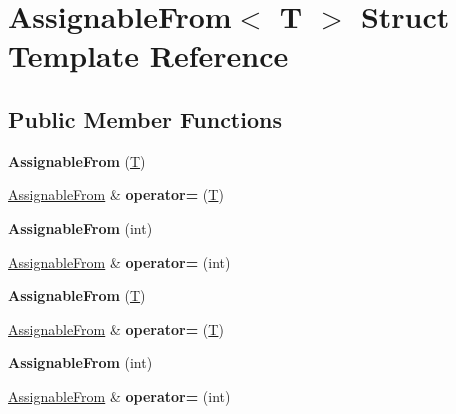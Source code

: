 \hypertarget{struct_assignable_from}{}\section{Assignable\+From$<$ T $>$ Struct Template Reference}
\label{struct_assignable_from}
\subsection*{Public Member Functions}
\begin{DoxyCompactItemize}
\item 
\mbox{\label{struct_assignable_from_a17b5723a93abf2e233bc35a784d2f0b2}} 
{\bfseries Assignable\+From} (\mbox{\hyperlink{struct_t}{T}})
\item 
\mbox{\label{struct_assignable_from_ad114c88030e422720616c0a503061048}} 
\mbox{\hyperlink{struct_assignable_from}{Assignable\+From}} \& {\bfseries operator=} (\mbox{\hyperlink{struct_t}{T}})
\item 
\mbox{\label{struct_assignable_from_ae9e879eee77960ea8fa64e04924dd8f9}} 
{\bfseries Assignable\+From} (int)
\item 
\mbox{\label{struct_assignable_from_a7d93b9b2e798813d5c1e9f2b8261fbcb}} 
\mbox{\hyperlink{struct_assignable_from}{Assignable\+From}} \& {\bfseries operator=} (int)
\item 
\mbox{\label{struct_assignable_from_a17b5723a93abf2e233bc35a784d2f0b2}} 
{\bfseries Assignable\+From} (\mbox{\hyperlink{struct_t}{T}})
\item 
\mbox{\label{struct_assignable_from_ad114c88030e422720616c0a503061048}} 
\mbox{\hyperlink{struct_assignable_from}{Assignable\+From}} \& {\bfseries operator=} (\mbox{\hyperlink{struct_t}{T}})
\item 
\mbox{\label{struct_assignable_from_ae9e879eee77960ea8fa64e04924dd8f9}} 
{\bfseries Assignable\+From} (int)
\item 
\mbox{\label{struct_assignable_from_a7d93b9b2e798813d5c1e9f2b8261fbcb}} 
\mbox{\hyperlink{struct_assignable_from}{Assignable\+From}} \& {\bfseries operator=} (int)
\end{DoxyCompactItemize}
